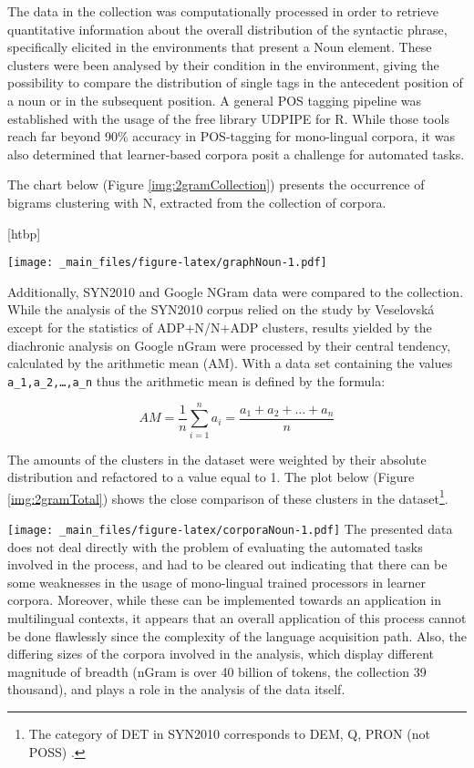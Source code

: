 \documentclass[
  a4paper,
  twoside,
  12pt,
  chapterprefix=false,
  listof=flat]{scrartcl}
\makeatletter
\def\fps@figure{htbp}
\renewenvironment{figure}[1][\fps@figure]{
  \edef\@tempa{\noexpand\@float{figure}[#1]} 
  \@tempa
  \sffamily
}{
  \end@float
}
\theoremstyle{plain} %
\theoremstyle{definition}
\theoremstyle{remark}
\makeatother
\begin{document}
The data in the collection was computationally processed in order to retrieve quantitative information about the overall distribution of the syntactic phrase, specifically elicited in the environments that present a Noun element. These clusters were been analysed by their condition in the environment, giving the possibility to compare the distribution of single tags in the antecedent position of a noun or in the subsequent position.
A general POS tagging pipeline was established with the usage of the free library UDPIPE for R. While those tools reach far beyond 90\% accuracy in POS-tagging for mono-lingual corpora, it was also determined that learner-based corpora posit a challenge for automated tasks.

The chart below (Figure \ref{img:2gramCollection}) presents the occurrence of bigrams clustering with N, extracted from the collection of corpora.

\begin{figure}
\centering
\texttt{[image: \_main\_files/figure-latex/graphNoun-1.pdf]}
\caption{\label{fig:graphNoun}\label{img:2gramCollection}Distribution of 2-grams with N in Collection}
\end{figure}

Additionally, SYN2010 and Google NGram data were compared to the collection.\\
While the analysis of the SYN2010 corpus relied on the study by Veselovská \citep{veselovska2014} except for the statistics of ADP+N/N+ADP clusters, results yielded by the diachronic analysis on Google nGram were processed by their central tendency, calculated by the arithmetic mean (AM).
With a data set containing the values \texttt{a\_1,a\_2,\ldots{},a\_n} thus the arithmetic mean is defined by the formula:

\begin{equation}
    AM=\frac{1}{n}\sum_{i=1}^n a_i = \frac{a_1 + a_2 + \ldots + a_n}{n} 
\end{equation}

The amounts of the clusters in the dataset were weighted by their absolute distribution and refactored to a value equal to 1. The plot below (Figure \ref{img:2gramTotal}) shows the close comparison of these clusters in the dataset\footnote{The category of DET in SYN2010 corresponds to DEM, Q, PRON (not POSS) \citep[20]{veselovska2014}.}.

\texttt{[image: \_main\_files/figure-latex/corporaNoun-1.pdf]}
The presented data does not deal directly with the problem of evaluating the automated tasks involved in the process, and had to be cleared out indicating that there can be some weaknesses in the usage of mono-lingual trained processors in learner corpora. Moreover, while these can be implemented towards an application in multilingual contexts, it appears that an overall application of this process cannot be done flawlessly since the complexity of the language acquisition path. Also, the differing sizes of the corpora involved in the analysis, which display different magnitude of breadth (nGram is over 40 billion of tokens, the collection 39 thousand), and plays a role in the analysis of the data itself.
\end{document}
